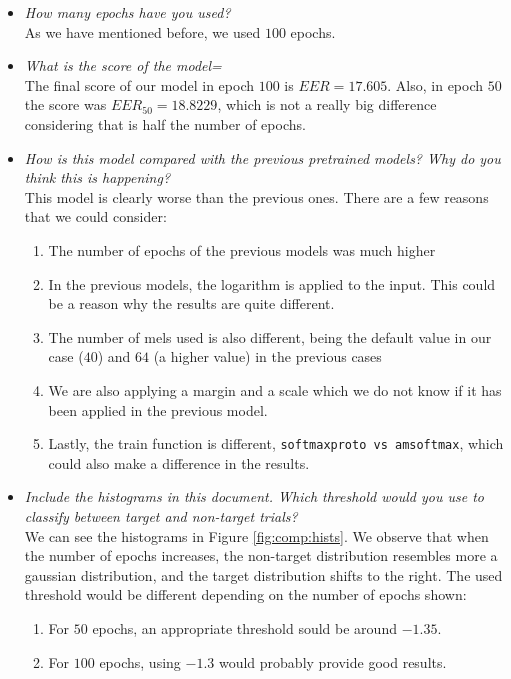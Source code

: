 \documentclass[a4paper]{article}
\def\inline{\lstinline[basicstyle=\ttfamily,keywordstyle={}]}
\begin{document}
\begin{itemize}
  \item \emph{How many epochs have you used?}\\
        As we have mentioned before, we used \(100\) epochs.

  \item \emph{What is the score of the model=}\\
        The final score of our model in epoch \(100\) is \(EER = 17.605\). Also, in epoch \(50\) the score was \(EER_{50} = 18.8229\), which is not a really big difference considering that is half the number of epochs.

  \item \emph{How is this model compared with the previous pretrained models? Why do you think this is happening?}\\
        This model is clearly worse than the previous ones. There are a few reasons that we could consider:
        \begin{enumerate}
          \item The number of epochs of the previous models was much higher
          \item In the previous models, the logarithm is applied to the input. This could be a reason why the results are quite different.
          \item The number of mels used is also different, being the default value in our case (\(40\)) and \(64\) (a higher value) in the previous cases
                \item We are also applying a margin and a scale which we do not know if it has been applied in the previous model.
          \item Lastly, the train function is different, \inline{softmaxproto vs amsoftmax}, which could also make a difference in the results.
        \end{enumerate}
  \item \emph{Include the histograms in this document. Which threshold would you use to classify between target and non-target trials?}\\
        We can see the histograms in Figure \ref{fig:comp:hists}. We observe that when the number of epochs increases, the non-target distribution resembles more a gaussian distribution, and the target distribution shifts to the right. The used threshold would be different depending on the number of epochs shown:
        \begin{enumerate}
          \item For \(50\) epochs, an appropriate threshold sould be around \(-1.35\).
                \item For \(100\) epochs, using \(-1.3\) would probably provide good results.
                \end{enumerate}
        \end{itemize}
\end{document}
